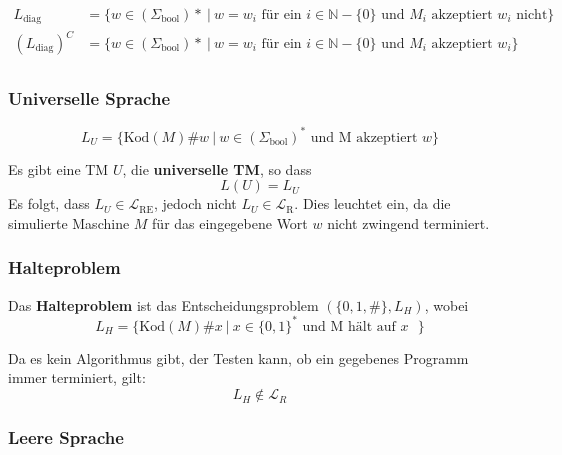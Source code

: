 \documentclass[11pt]{article}
\begin{document}
\begin{equation*}
\begin{split}
	L_\text{diag} &  = \{ w \in (\Sigma_\text{bool})*\ |\ w = w_i \text{ für ein } i \in \mathbb{N} - \{0\} \text{ und $M_i$ akzeptiert $w_i$ nicht} \} \\
	(L_\text{diag})^C &  = \{ w \in (\Sigma_\text{bool})*\ |\ w = w_i \text{ für ein } i \in \mathbb{N} - \{0\} \text{ und $M_i$ akzeptiert $w_i$} \} \\
\end{split}
\end{equation*}

\subsubsection{Universelle Sprache}

\begin{equation*}
	L_U = \{\text{Kod}(M)\#w\ |\ w \in (\Sigma_\text{bool})^* \text{ und M akzeptiert $w$}\}
\end{equation*}

Es gibt eine TM $U$, die \textbf{universelle TM}, so dass
\begin{equation*}
	L(U) = L_U
\end{equation*}
Es folgt, dass $L_U \in \mathcal{L}_\text{RE}$, jedoch nicht $L_U \in \mathcal{L}_\text{R}$. Dies leuchtet ein, da die simulierte Maschine $M$ f{\"u}r das eingegebene Wort $w$ nicht zwingend terminiert.

\subsubsection{Halteproblem}

Das \textbf{Halteproblem} ist das Entscheidungsproblem $(\{0, 1, \#\}, L_H)$, wobei
\begin{equation*}
	L_H = \{\text{Kod}(M)\#x\ |\ x \in \{0,1\}^* \text{ und M h{\"a}lt auf $x$ }\}
\end{equation*}

Da es kein Algorithmus gibt, der Testen kann, ob ein gegebenes Programm immer terminiert, gilt:
\begin{equation*}
	L_H \not\in \mathcal{L}_R
\end{equation*}

\subsubsection{Leere Sprache}
\end{document}
